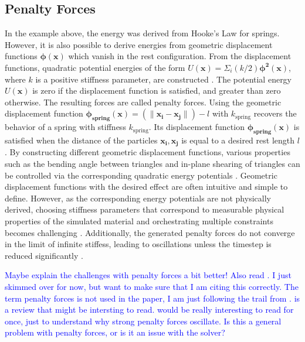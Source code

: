 \documentclass{article}
\begin{document}
\subsection*{Penalty Forces}
In the example above, the energy was derived from Hooke's Law for springs. However, it is also possible to derive energies from 
geometric displacement functions $\bm{\phi(x)}$ which vanish in the rest configuration. From the displacement functions, quadratic 
potential energies of the form $U(\bm{x}) = \Sigma_i (k / 2) \bm{\phi^2(x)}$, where $k$ is a positive stiffness parameter, are 
constructed \cite{terz1987}. The potential energy $U(\bm{x})$ is zero if the displacement function is satisfied, and greater than 
zero otherwise. The resulting forces are called penalty forces.
Using the geometric displacement function $\bm{\phi_{\text{spring}}(x)} = (\lVert \bm{x_i} - \bm{x_j} \rVert) - l$ with $k_{\text{spring}}$ 
recovers the behavior of a spring with stiffness $k_{\text{spring}}$. Its displacement function $\bm{\phi_{\text{spring}}(x)}$ is 
satisfied when the distance of the particles $\bm{x_i}, \bm{x_j}$ is equal to a desired rest length $l$. By constructing different 
geometric displacement functions, various properties such as the bending angle between triangles and in-plane shearing of triangles 
can be controlled via the corresponding quadratic energy potentials \cite{baraff1998}. Geometric displacement functions with the desired effect are 
often intuitive and simple to define. However, as the corresponding energy potentials are not physically derived, choosing stiffness 
parameters that correspond to measurable physical properties of the simulated material and orchestrating multiple constraints becomes 
challenging \cite{servin2006, nealen2006}. Additionally, the generated penalty forces do not converge in the limit of infinite stiffess, leading
to oscillations unless the timestep is reduced significantly \cite{rubin1957}.

\textcolor{blue}{Maybe explain the challenges with penalty forces a bit better! Also read \cite{terz1987, nealen2006, rubin1957}. 
I just skimmed over \cite{terz1987} for now, but want to make sure that I am citing this correctly. The term penalty forces is not used
in the paper, I am just following the trail from \cite{servin2006}. \cite{nealen2006} is a review that might be intersting to read.
\cite{rubin1957} would be really interesting to read for once, just to understand why strong penalty forces oscillate. Is this a
general problem with penalty forces, or is it an issue with the solver?}
\end{document}
